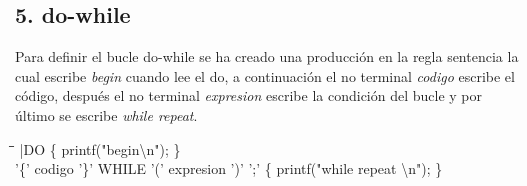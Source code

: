 \documentclass[11pt,spanish]{article}
\begin{document}
        \subsection*{5. do-while}
        Para definir el bucle do-while se ha creado una producción en la regla {\ttfamily sentencia} la cual escribe \textit {begin} cuando lee el do, a continuación el no terminal \textit {codigo} escribe el código, después el no terminal \textit {expresion} escribe la condición del bucle y por último se escribe \textit {while repeat}.
        \begin{tabbing}
        \hspace*{1cm}\=\hspace*{1cm}\= \hspace*{6cm}\=\kill
        \>|DO\>\>											\{ printf("begin\textbackslash n"); \}\\
        \>'\{' codigo '\}' WHILE '(' expresion ')' ';'\> \> \{ printf("while repeat \textbackslash n"); \}\\
        \end{tabbing}
\end{document}
